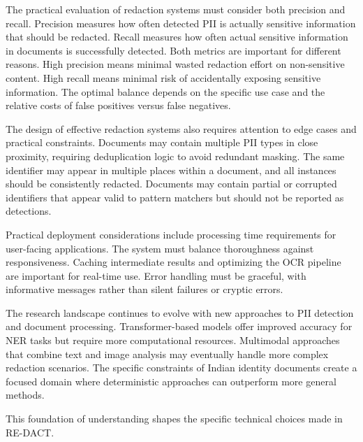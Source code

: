 The practical evaluation of redaction systems must consider both precision and recall. Precision measures how often detected PII is actually sensitive information that should be redacted. Recall measures how often actual sensitive information in documents is successfully detected. Both metrics are important for different reasons. High precision means minimal wasted redaction effort on non-sensitive content. High recall means minimal risk of accidentally exposing sensitive information. The optimal balance depends on the specific use case and the relative costs of false positives versus false negatives.

The design of effective redaction systems also requires attention to edge cases and practical constraints. Documents may contain multiple PII types in close proximity, requiring deduplication logic to avoid redundant masking. The same identifier may appear in multiple places within a document, and all instances should be consistently redacted. Documents may contain partial or corrupted identifiers that appear valid to pattern matchers but should not be reported as detections.

Practical deployment considerations include processing time requirements for user-facing applications. The system must balance thoroughness against responsiveness. Caching intermediate results and optimizing the OCR pipeline are important for real-time use. Error handling must be graceful, with informative messages rather than silent failures or cryptic errors.

The research landscape continues to evolve with new approaches to PII detection and document processing. Transformer-based models offer improved accuracy for NER tasks but require more computational resources. Multimodal approaches that combine text and image analysis may eventually handle more complex redaction scenarios. The specific constraints of Indian identity documents create a focused domain where deterministic approaches can outperform more general methods.

\bigskip

This foundation of understanding shapes the specific technical choices made in RE-DACT.

